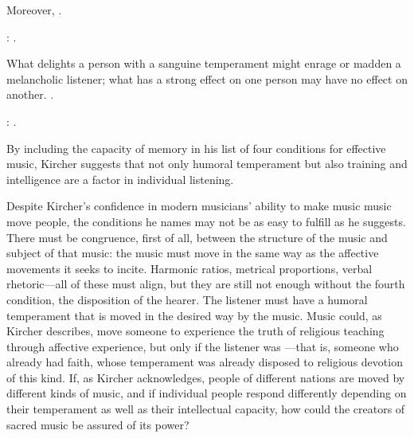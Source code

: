 Moreover, .%
    \begin{Footnote}
        \Autocite[544]{Kircher:Musurgia}: .
    \end{Footnote}
What delights a person with a sanguine temperament might enrage or madden a melancholic listener; what has a strong effect on one person may have no effect on another.%
    \Autocite[550]{Kircher:Musurgia}
.%
    \begin{Footnote}
        \Autocite[550]{Kircher:Musurgia}: .
    \end{Footnote}
By including the capacity of memory in his list of four conditions for effective music, Kircher suggests that not only humoral temperament but also training and intelligence are a factor in individual listening.

Despite Kircher's confidence in modern musicians' ability to make music music move people, the conditions he names may not be as easy to fulfill as he suggests.
There must be congruence, first of all, between the structure of the music and subject of that music: the music must move in the same way as the affective movements it seeks to incite.
Harmonic ratios, metrical proportions, verbal rhetoric---all of these must align, but they are still not enough without the fourth condition, the disposition of the hearer.
The listener must have a humoral temperament that is moved in the desired way by the music. 
Music could, as Kircher describes, move someone to experience the truth of religious teaching through affective experience, but only if the listener was ---that is, someone who already had faith, whose temperament was already disposed to religious devotion of this kind. 
If, as Kircher acknowledges, people of different nations are moved by different kinds of music, and if individual people respond differently depending on their temperament as well as their intellectual capacity, how could the creators of sacred music be assured of its power?

